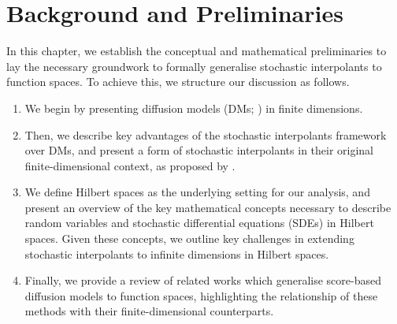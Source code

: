 
\chapter{Background and Preliminaries}\label{cha:2}

\ifpdf
\graphicspath{{Chapter2/Figs/Raster/}{Chapter2/Figs/PDF/}{Chapter2/Figs/}}
\else
\graphicspath{{Chapter2/Figs/Vector/}{Chapter2/Figs/}}
\fi

In this chapter, we establish the conceptual and mathematical preliminaries to lay the necessary groundwork to formally generalise stochastic interpolants \citep{albergo2023stochasticinterpolantsunifyingframework} to function spaces. To achieve this, we structure our discussion as follows.

\begin{enumerate}
  \item We begin by presenting diffusion models (DMs; \citealp{song2021scorebasedgenerativemodelingstochastic,hyvarinen2005estimation,ho2020denoisingdiffusionprobabilisticmodels}) in finite dimensions.
  \item Then, we describe key advantages of the stochastic interpolants framework over DMs, and present a form of stochastic interpolants in their original finite-dimensional context, as proposed by \citet{albergo2023stochasticinterpolantsunifyingframework}.
  \item We define Hilbert spaces as the underlying setting for our analysis, and present an overview of the key mathematical concepts necessary to describe random variables and stochastic differential equations (SDEs) in Hilbert spaces. Given these concepts, we outline key challenges in extending stochastic interpolants to infinite dimensions in Hilbert spaces.
  \item Finally, we provide a review of related works which generalise score-based diffusion models \citep{song2021scorebasedgenerativemodelingstochastic} to function spaces, highlighting the relationship of these methods with their finite-dimensional counterparts.
\end{enumerate}


